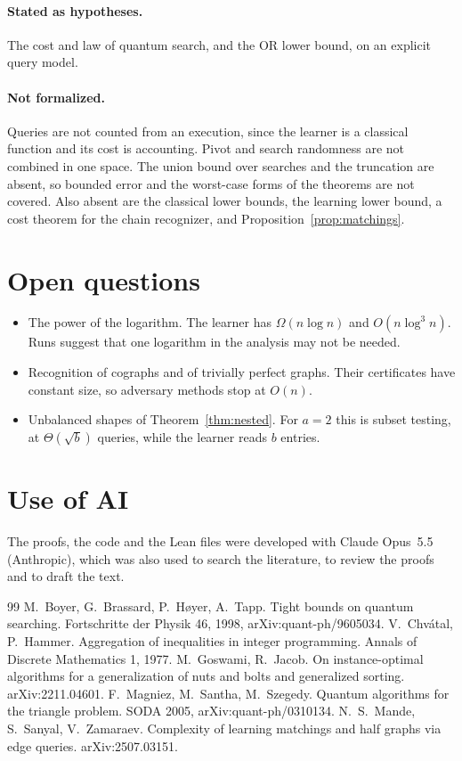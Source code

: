 \documentclass[11pt]{article}
\theoremstyle{remark}
\begin{document}
\paragraph{Stated as hypotheses.} The cost and law of quantum search, and the OR lower bound, on an explicit query model.

\paragraph{Not formalized.} Queries are not counted from an execution, since the learner is a classical function and its cost is accounting. Pivot and search randomness are not combined in one space. The union bound over searches and the truncation are absent, so bounded error and the worst-case forms of the theorems are not covered. Also absent are the classical lower bounds, the learning lower bound, a cost theorem for the chain recognizer, and Proposition~\ref{prop:matchings}.

\section{Open questions}

\begin{itemize}[leftmargin=1.5em]
\item The power of the logarithm. The learner has $\Omega(n\log n)$ and $O(n\log^3 n)$. Runs suggest that one logarithm in the analysis may not be needed.
\item Recognition of cographs and of trivially perfect graphs. Their certificates have constant size, so adversary methods stop at $O(n)$.
\item Unbalanced shapes of Theorem~\ref{thm:nested}. For $a=2$ this is subset testing, at $\Theta(\sqrt b)$ queries, while the learner reads $b$ entries.
\end{itemize}

\section*{Use of AI}

The proofs, the code and the Lean files were developed with Claude Opus~5.5 (Anthropic), which was also used to search the literature, to review the proofs and to draft the text.

\begin{thebibliography}{99}
 M.~Boyer, G.~Brassard, P.~H\o yer, A.~Tapp. Tight bounds on quantum searching. Fortschritte der Physik 46, 1998, arXiv:quant-ph/9605034.
 V.~Chv\'atal, P.~Hammer. Aggregation of inequalities in integer programming. Annals of Discrete Mathematics 1, 1977.
 M.~Goswami, R.~Jacob. On instance-optimal algorithms for a generalization of nuts and bolts and generalized sorting. arXiv:2211.04601.
 F.~Magniez, M.~Santha, M.~Szegedy. Quantum algorithms for the triangle problem. SODA 2005, arXiv:quant-ph/0310134.
 N.~S.~Mande, S.~Sanyal, V.~Zamaraev. Complexity of learning matchings and half graphs via edge queries. arXiv:2507.03151.
\end{thebibliography}
\end{document}
